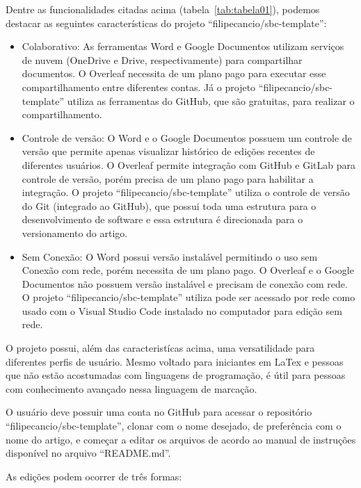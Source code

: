 Dentre as funcionalidades citadas acima (tabela~\ref{tab:tabela01}), podemos destacar as seguintes características do projeto ``filipecancio/sbc-template'':

\begin{itemize}
	\item Colaborativo: As ferramentas Word e Google Documentos utilizam serviços de nuvem (OneDrive e Drive, respectivamente) para compartilhar documentos. O Overleaf necessita de um plano pago para executar esse compartilhamento entre diferentes contas. Já o projeto ``filipecancio/sbc-template'' utiliza as ferramentas do GitHub, que são gratuitas, para realizar o compartilhamento.
	\item Controle de versão: O Word e o Google Documentos possuem um controle de versão que permite apenas visualizar histórico de edições recentes de diferentes usuários. O Overleaf permite integração com GitHub e GitLab para controle de versão, porém precisa de um plano pago para habilitar a integração. O projeto ``filipecancio/sbc-template'' utiliza o controle de versão do Git (integrado ao GitHub), que possui toda uma estrutura para o desenvolvimento de software e essa estrutura é direcionada para o versionamento do artigo.
	\item Sem Conexão: O Word possui versão instalável permitindo o uso sem Conexão com rede, porém necessita de um plano pago. O Overleaf e o Google Documentos não possuem versão instalável e precisam de conexão com rede. O projeto ``filipecancio/sbc-template'' utiliza pode ser acessado por rede como usado com o Visual Studio Code instalado no computador para edição sem rede.
\end{itemize}

O projeto possui, além das caracteristícas acima, uma versatilidade para diferentes perfis de usuário. Mesmo voltado para iniciantes em LaTex e pessoas que não estão acostumadas com linguagens de programação, é útil para pessoas com conhecimento avançado nessa linguagem de marcação. 

O usuário deve possuir uma conta no GitHub para acessar o repositório ``filipecancio/sbc-template'', clonar com o nome desejado, de preferência com o nome do artigo, e começar a editar os arquivos de acordo ao manual de instruções disponível no arquivo ``README.md''.

As edições podem ocorrer de três formas:


